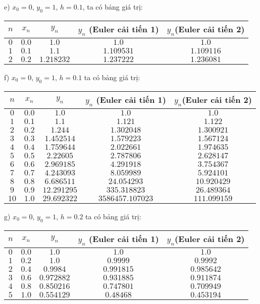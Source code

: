 e) $x_0=0$, $y_0=1$, $h=0.1$, ta có bảng giá trị:
\begin{longtable}{|c|c|c|c|c|}\hline
	$n$ & $x_n$ & $y_n$ & $y_n$ (Euler cải tiến 1) & $y_n$(Euler cải tiến 2) \\ \hline
	\endhead
	$0$ & $0.0$ & $1.0$ & $1.0$ & $1.0$ \\ \hline
	$1$ & $0.1$ & $1.1$ & $1.109531$ & $1.109116$ \\ \hline
	$2$ & $0.2$ & $1.218232$ & $1.237222$ & $1.236081$ \\ \hline
\end{longtable}

f) $x_0=0$, $y_0=1$, $h=0.1$ ta có bảng giá trị:
\begin{longtable}{|c|c|c|c|c|}\hline
	$n$ & $x_n$ & $y_n$ & $y_n$ (Euler cải tiến 1) & $y_n$(Euler cải tiến 2) \\ \hline
	\endhead
	$0$ & $0.0$ & $1.0$ & $1.0$ & $1.0$ \\ \hline
	$1$ & $0.1$ & $1.1$ & $1.121$ & $1.122$ \\ \hline
	$2$ & $0.2$ & $1.244$ & $1.302048$ & $1.300921$ \\ \hline
	$3$ & $0.3$ & $1.452514$ & $1.579223$ & $1.567124$ \\ \hline
	$4$ & $0.4$ & $1.759644$ & $2.022661$ & $1.974635$ \\ \hline
	$5$ & $0.5$ & $2.22605$ & $2.787806$ & $2.628147$ \\ \hline
	$6$ & $0.6$ & $2.969185$ & $4.291918$ & $3.754367$ \\ \hline
	$7$ & $0.7$ & $4.243093$ & $8.059989$ & $5.924101$ \\ \hline
	$8$ & $0.8$ & $6.686511$ & $24.054293$ & $10.920429$ \\ \hline
	$9$ & $0.9$ & $12.291295$ & $335.318823$ & $26.489364$ \\ \hline
	$10$ & $1.0$ & $29.692322$ & $3586457.107023$ & $111.099159$ \\ \hline
\end{longtable}

g) $x_0=0$, $y_0=1$, $h=0.2$ ta có bảng giá trị:
\begin{longtable}{|c|c|c|c|c|}\hline
	$n$ & $x_n$ & $y_n$ & $y_n$ (Euler cải tiến 1) & $y_n$(Euler cải tiến 2) \\ \hline
	$0$ & $0.0$ & $1.0$ & $1.0$ & $1.0$ \\ \hline
	$1$ & $0.2$ & $1.0$ & $0.9999$ & $0.9992$ \\ \hline
	$2$ & $0.4$ & $0.9984$ & $0.991815$ & $0.985642$ \\ \hline
	$3$ & $0.6$ & $0.972882$ & $0.931885$ & $0.911874$ \\ \hline
	$4$ & $0.8$ & $0.850216$ & $0.747801$ & $0.709949$ \\ \hline
	$5$ & $1.0$ & $0.554129$ & $0.48468$ & $0.453194$ \\ \hline
\end{longtable}


